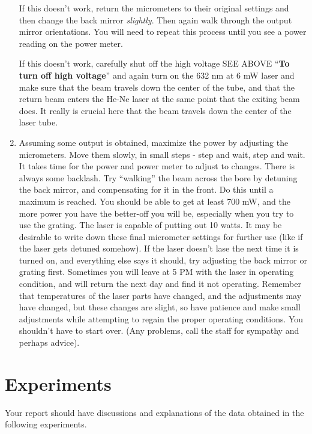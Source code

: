 \documentclass{../lab}
\begin{document}
\begin{enumerate}
    If this doesn't work, return the micrometers to their original settings and then change the back mirror \emph{slightly}. Then again walk through the output mirror orientations. You will need to repeat this process until you see a power reading on the power meter.
    
    If this doesn't work, carefully shut off the high voltage SEE ABOVE ``\textbf{To turn off high voltage}'' and again turn on the 632 nm at 6 mW laser and make sure that the beam travels down the center of the tube, and that the return beam enters the He-Ne laser at the same point that the exiting beam does. It really is crucial here that the beam travels down the center of the laser tube.
    
    \item Assuming some output is obtained, maximize the power by adjusting the micrometers. Move them slowly, in small steps - step and wait, step and wait. It takes time for the power and power meter to adjust to changes. There is always some backlash. Try ``walking'' the beam across the bore by detuning the back mirror, and compensating for it in the front. Do this until a maximum is reached. You should be able to get at least 700 mW, and the more power you have the better-off you will be, especially when you try to use the grating. The laser is capable of putting out 10 watts. It may be desirable to write down these final micrometer settings for further use (like if the laser gets detuned somehow). If the laser doesn't lase the next time it is turned on, and everything else says it should, try adjusting the back mirror or grating first. Sometimes you will leave at 5 PM with the laser in operating condition, and will return the next day and find it not operating. Remember that temperatures of the laser parts have changed, and the adjustments may have changed, but these changes are slight, so have patience and make small adjustments while attempting to regain the proper operating conditions. You shouldn't have to start over. (Any problems, call the staff for sympathy and perhaps advice).
\end{enumerate}

\pagebreak

\section{Experiments}

Your report should have discussions and explanations of the data obtained in the following experiments.
\end{document}
